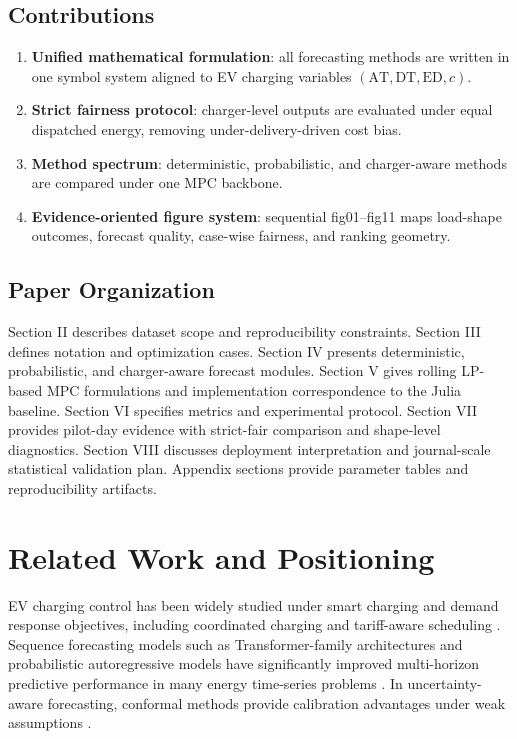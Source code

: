 \documentclass[journal]{IEEEtran}
\newcommand{\AT}{\mathrm{AT}}
\newcommand{\DT}{\mathrm{DT}}
\newcommand{\ED}{\mathrm{ED}}
\begin{document}
\subsection{Contributions}
\begin{enumerate}
    \item \textbf{Unified mathematical formulation}: all forecasting methods are written in one symbol system aligned to EV charging variables $(\AT,\DT,\ED,c)$.
    \item \textbf{Strict fairness protocol}: charger-level outputs are evaluated under equal dispatched energy, removing under-delivery-driven cost bias.
    \item \textbf{Method spectrum}: deterministic, probabilistic, and charger-aware methods are compared under one MPC backbone.
    \item \textbf{Evidence-oriented figure system}: sequential fig01--fig11 maps load-shape outcomes, forecast quality, case-wise fairness, and ranking geometry.
\end{enumerate}

\subsection{Paper Organization}
Section II describes dataset scope and reproducibility constraints. Section III defines notation and optimization cases. Section IV presents deterministic, probabilistic, and charger-aware forecast modules. Section V gives rolling LP-based MPC formulations and implementation correspondence to the Julia baseline. Section VI specifies metrics and experimental protocol. Section VII provides pilot-day evidence with strict-fair comparison and shape-level diagnostics. Section VIII discusses deployment interpretation and journal-scale statistical validation plan. Appendix sections provide parameter tables and reproducibility artifacts.

\section{Related Work and Positioning}
EV charging control has been widely studied under smart charging and demand response objectives, including coordinated charging and tariff-aware scheduling \cite{mpc_ev_review}. Sequence forecasting models such as Transformer-family architectures and probabilistic autoregressive models have significantly improved multi-horizon predictive performance in many energy time-series problems \cite{transformer,tft,deepar}. In uncertainty-aware forecasting, conformal methods provide calibration advantages under weak assumptions \cite{conformal}.
\end{document}
